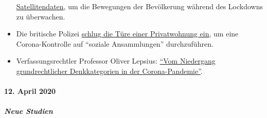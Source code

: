 \begin{itemize}
  \href{https://www.ansa.it/english/news/2020/04/06/coronavirus-italy-activates-satellite-to-monitor-nation-3_f2ffb30c-d550-42f5-82fc-ec1f82c5c625.html}{Satellitendaten},
  um die Bewegungen der Bevölkerung während des Lockdowns zu überwachen.
\item
  Die britische Polizei
  \href{https://twitter.com/BanTheBBC/status/1249598512427347969}{schlug
  die Türe einer Privatwohnung ein}, um eine Corona-Kontrolle auf
  ``soziale Ansammlungen'' durchzuführen.
\item
  Verfassungsrechtler Professor Oliver Lepsius:
  \href{https://verfassungsblog.de/vom-niedergang-grundrechtlicher-denkkategorien-in-der-corona-pandemie/}{``Vom
  Niedergang grundrechtlicher Denkkategorien in der Corona-Pandemie''}.
\end{itemize}

\hypertarget{12-april-2020}{%
\paragraph{12. April 2020}\label{12-april-2020}}

\hypertarget{neue-studien}{%
\subparagraph{\texorpdfstring{\textbf{Neue
Studien}}{Neue Studien}}\label{neue-studien}}

